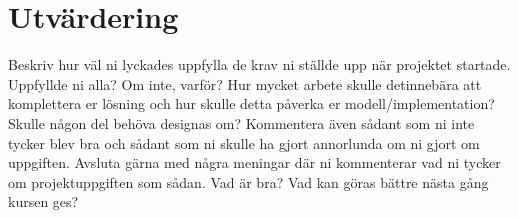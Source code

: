 \section{Utvärdering}
Beskriv hur väl ni lyckades uppfylla de krav ni ställde upp när projektet startade. Uppfyllde ni alla? Om inte, varför? Hur mycket arbete skulle detinnebära att komplettera er lösning och
hur skulle detta påverka er modell/implementation? Skulle någon del behöva designas om? Kommentera även sådant som ni inte tycker blev bra och sådant som ni skulle ha gjort annorlunda om ni gjort om uppgiften. Avsluta gärna med några meningar där ni kommenterar vad ni tycker om projektuppgiften som sådan. Vad är bra? Vad kan göras bättre nästa gång kursen ges?